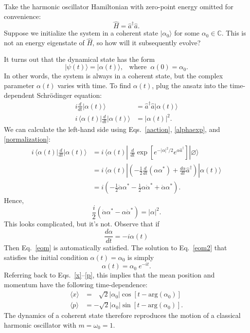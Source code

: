 \documentclass[pra,12pt]{revtex4}
\begin{document}
Take the harmonic oscillator Hamiltonian with zero-point energy
omitted for convenience:
\begin{equation}
  \hat{H} = \hat{a}^\dagger \hat{a}.
\end{equation}
Suppose we initialize the system in a coherent state
$|\alpha_0\rangle$ for some $\alpha_0 \in \mathbb{C}$.  This is not an
energy eigenstate of $\hat{H}$, so how will it subsequently evolve?

It turns out that the dynamical state has the form
\begin{equation}
  |\psi(t)\rangle = |\alpha(t)\rangle, \;\;\;\mathrm{where}\;\;\alpha(0) = \alpha_0.
\end{equation}
In other words, the system is always in a coherent state, but the
complex parameter $\alpha(t)$ varies with time.  To find $\alpha(t)$,
plug the ansatz into the time-dependent Schr\"odinger equation:
\begin{align}
  i \frac{d}{dt} |\alpha(t)\rangle &= \hat{a}^\dagger \hat{a} |\alpha(t)\rangle\\
  i \,\Big\langle\alpha(t)\Big| \frac{d}{dt} \Big|\alpha(t)\Big\rangle &=
  |\alpha(t)|^2.
\end{align}
We can calculate the left-hand side using Eqs.~\eqref{aaction},
\eqref{alphaexp}, and \eqref{normalization}:
\begin{align}
  i \, \Big\langle\alpha(t)\Big| \frac{d}{dt} \Big|\alpha(t)\Big\rangle
  &= i\, \langle \alpha(t) | \; \frac{d}{dt}
  \exp\left[ e^{-|\alpha|^2/2} e^{\alpha\hat{a}^\dagger} \right]
  |\varnothing\rangle \\
  &= i\, \langle \alpha(t) | \left(-\frac{1}{2} \frac{d}{dt}(\alpha\alpha^*)
  + \frac{d\alpha}{dt} \hat{a}^\dagger \right) |\alpha(t)\rangle \\
  &= i \left(-\frac{1}{2} \dot{\alpha}\alpha^*
  - \frac{1}{2}\alpha\dot{\alpha}^* + \dot{\alpha}\alpha^*\right).
\end{align}
Hence,
\begin{equation}
  \frac{i}{2}\left(\dot{\alpha}\alpha^* - \alpha\dot{\alpha}^*\right) = |\alpha|^2.
  \label{eom}
\end{equation}
This looks complicated, but it's not.  Observe that if
\begin{equation}
  \frac{d\alpha}{dt} = -i \alpha(t)
  \label{eom2}
\end{equation}
Then Eq.~\eqref{eom} is automatically satisfied.  The solution to
Eq.~\eqref{eom2} that satisfies the initial condition $\alpha(t) =
\alpha_0$ is simply
\begin{equation}
  \alpha(t) = \alpha_0 \; e^{-it}.
\end{equation}
Referring back to Eqs.~\eqref{x}--\eqref{p}, this implies that the
mean position and momentum have the following time-dependence:
\begin{align}
  \langle x\rangle &=\, \;\;\sqrt{2} |\alpha_0| \cos\left[t - \mathrm{arg}(\alpha_0)\right] \\
  \langle p\rangle &= -\sqrt{2} |\alpha_0| \sin\left[t - \mathrm{arg}(\alpha_0)\right].
\end{align}
The dynamics of a coherent state therefore reproduces the motion of a
classical harmonic oscillator with $m = \omega_0 = 1$.
\end{document}
